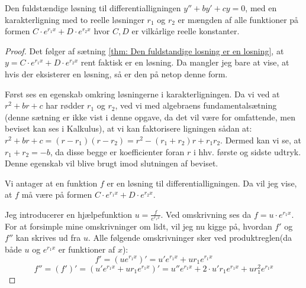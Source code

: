 \begin{thm}\label{thm: fuldstandig losning}
Den fuldstændige løsning til differentialligningen $y'' + by' + cy = 0$, med en karakterligning med to reelle løsninger $r_1$ og $r_2$ er mængden af alle funktioner på formen $C \cdot e^{r_1 x} + D \cdot e^{r_2 x}$ hvor $C,D$ er vilkårlige reelle konstanter.
\end{thm}
\begin{proof}
Det følger af sætning \ref{thm: Den fuldstandige losning er en losning}, at $y = C \cdot e^{r_1 x} + D \cdot e^{r_2 x}$ rent faktisk er en løsning. 
Da mangler jeg bare at vise, at hvis der eksisterer en løsning, så er den på netop denne form.

Først ses en egenskab omkring løsningerne i karakterligningen. 
Da vi ved at $r^2 + br + c$ har rødder $r_1$ og $r_2$, ved vi med algebraens fundamentalsætning (denne sætning er ikke vist i denne opgave, da det vil være for omfattende, men beviset kan ses i Kalkulus), at vi kan faktorisere ligningen sådan at: $r^2 + br + c = (r-r_1)(r - r_2) = r^2 -(r_1 + r_2)r + r_1 r_2$. 
Dermed kan vi se, at $r_1 + r_2 = -b$, da disse begge er koefficienter foran $r$ i hhv. første og sidste udtryk. 
Denne egenskab vil blive brugt imod slutningen af beviset. 

Vi antager at en funktion $f$ er en løsning til differentialligningen. 
Da vil jeg vise, at $f$ må være på formen $C \cdot e^{r_1 x} + D \cdot e^{r_2 x}$. 

Jeg introducerer en hjælpefunktion $u = \frac{f}{e^{r_1 x}}$. 
Ved omskrivning ses da $f = u \cdot e^{r_1 x}$. 
For at forsimple mine omskrivninger om lidt, vil jeg nu kigge på, hvordan $f'$ og $f''$ kan skrives ud fra $u$.
Alle følgende omskrivninger sker ved produktreglen(da både $u$ og $e^{r_1 x}$ er funktioner af $x$):
$$f' = (u e^{r_1 x})' = u'e^{r_1 x} + ur_1 e^{r_1 x}$$
$$f'' = (f')' = (u'e^{r_1 x} + ur_1 e^{r_1 x})' = u''e^{r_1 x} + 2\cdot u' r_1 e^{r_1 x} + u r_1^2 e^{r_1 x}$$


\end{proof}

